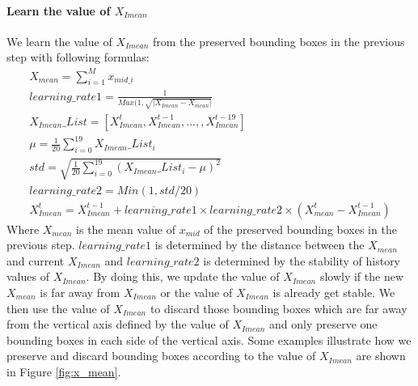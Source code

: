 \paragraph*{Learn the value of \(X_{Imean}\)}
We learn the value of \(X_{Imean}\) from the preserved bounding boxes in the previous step with following formulas: 
\begin{eqnarray}
 	X_{mean} = \sum_{i=1}^M x_{mid\_i} \\
 	learning\_rate1 = \frac{1}{Max(1,\sqrt{|X_{Imean} - X_{mean}|}} \\
 	X_{Imean}\_List = [X_{Imean}^t,X_{Imean}^{t-1},...,,X_{Imean}^{t-19}] \\
 	\mu = \frac{1}{20}\sum_{i=0}^{19}X_{Imean}\_List_i \\
 	std = \sqrt{\frac{1}{20}\sum_{i=0}^{19}(X_{Imean}\_List_i - \mu)^2} \\
 	learning\_rate2 = Min(1,std/20) \\
 	X_{Imean}^t = X_{Imean}^{t-1} + learning\_rate1 \times learning\_rate2 \times (X_{mean}^{t} - X_{Imean}^{t-1})
\end{eqnarray}
Where \(X_{mean}\) is the mean value of \(x_{mid}\) of the preserved bounding boxes in the previous step. \(learning\_rate1\) is determined by the distance between the \(X_{mean}\) and current \(X_{Imean}\) and \(learning\_rate2\) is determined by the stability of history values of  \(X_{Imean}\). By doing this, we update the value of \(X_{Imean}\) slowly if the new \(X_{mean}\) is far away from \(X_{Imean}\) or the value of \(X_{Imean}\) is already get stable.
We then use the value of \(X_{Imean}\) to discard those bounding boxes which are far away from the vertical axis defined by the value of \(X_{Imean}\) and only preserve one bounding boxes in each side of the vertical axis. Some examples illustrate how we preserve and discard bounding boxes according to the value of \(X_{Imean}\) are shown in Figure \ref{fig:x_mean}.
